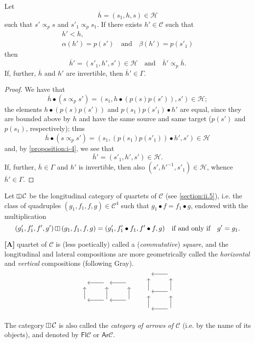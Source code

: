 \documentclass[a4paper,fleqn]{article}
\theoremstyle{plain}
\newenvironment{proposition}[1]
  {\renewcommand\theinnerproposition{#1}\innerproposition}
  {\endinnerproposition}
\theoremstyle{definition}
\newenvironment{longcomm}[1]
  {\noindent\textbf{[#1]}\rmfamily}
  {}
\newcommand{\oldpage}[1]{{\marginpar{\footnotesize$\bigg\vert$\,\,\,\,\textit{p.~#1}}}}
\newcommand{\textand}{\quad\text{and}\quad}
\newcommand{\CC}{\mathcal{C}}
\newcommand{\HH}{\mathcal{H}}
\newcommand{\subs}{\mathrel{\propto}}
\newcommand{\vsqbox}{{\rotatebox{90}{$\boxminus$}}}
\DeclareMathOperator{\vsq}{\raisebox{-.1em}{$\vsqbox$}}
\newcommand{\vmult}{\mathbin{\raisebox{-.1em}{$\vsqbox$}}}
\newcommand{\smallbullet}{\bullet}
\begin{document}
\begin{proposition}{7}
\label{proposition:i-7}
  Let
  \[
    \overline{h}
    = (s_1,h,s)
    \in\HH
  \]
  such that $s'\subs_p s$ and $s'_1\subs_p s_1$.
  If there exists $h'\in\CC$ such that
  \[
    \begin{gathered}
      h'<h,
    \\\alpha(h')=p(s')
      \textand
      \beta(h')=p(s'_1)
    \end{gathered}
  \]
  then
  \[
    \overline{h}'
    =(s'_1,h',s')
    \in\HH
    \textand
    \overline{h}'\subs_p\overline{h}.
  \]
  If, further, $\overline{h}$ and $h'$ are invertible, then $\overline{h}'\in\Gamma$.
\end{proposition}

\begin{proof}
  We have that
  \[
    \overline{h}\smallbullet(s\subs_p s')
    = (s_1,h\smallbullet(p(s)p(s')),s')
    \in\HH;
  \]
  the elements $h\smallbullet(p(s)p(s'))$ and $p(s_1)p(s'_1)\smallbullet h'$ are equal, since they are bounded above by $h$ and have the same source and same target ($p(s')$ and $p(s_1)$, respectively);
  thus
  \[
    \overline{h}\smallbullet(s\subs_p s')
    = (s_1,(p(s_1)p(s'_1))\smallbullet h',s')
    \in\HH
  \]
  and, by \cref{proposition:i-4}, we see that
  \[
    \overline{h}'
    = (s'_1,h',s')
    \in\HH.
  \]
  \oldpage{365}
  If, further, $\overline{h}\in\Gamma$ and $h'$ is invertible, then also $(s',h'^{-1},s'_1)\in\HH$, whence $\overline{h}'\in\Gamma$.
\end{proof}

Let $\vsq\CC$ be the longitudinal category of quartets of $\CC$ (see \cref{section:ii.5}), i.e. the class of quadruples $(g_1,f_1,f,g)\in\CC^4$ such that $g_1\smallbullet f=f_1\smallbullet g$, endowed with the multiplication
\[
  (g'_1,f'_1,f',g')\vmult(g_1,f_1,f,g)
  = (g'_1,f'_1\smallbullet f_1,f'\smallbullet f,g)
  \quad\text{if and only if}\quad
  g'=g_1.
\]

\begin{longcomm}{37.1}
  A quartet of $\CC$ is (less poetically) called a (\emph{commutative}) \emph{square}, and the longitudinal and lateral compositions are more geometrically called the \emph{horizontal} and \emph{vertical} compositions (following Gray).
  \[
    \begin{tikzcd}
      {}
      &{} \ar[l]
      &{} \ar[l]
    \\{} \ar[u]
      &{} \ar[l] \ar[u]
      &{} \ar[l] \ar[u]
    \end{tikzcd}
    \qquad
    \begin{tikzcd}
      {}
      & \ar[l]
    \\{} \ar[u]
      & \ar[l] \ar[u]
    \\{} \ar[u]
      & \ar[l] \ar[u]
    \end{tikzcd}
  \]

  The category $\vsq\CC$ is also called the \emph{category of arrows of $\CC$} (i.e. by the name of its objects), and denoted by $\mathsf{Fl}\CC$ or $\mathsf{Ar}\CC$.
\end{longcomm}
\end{document}
